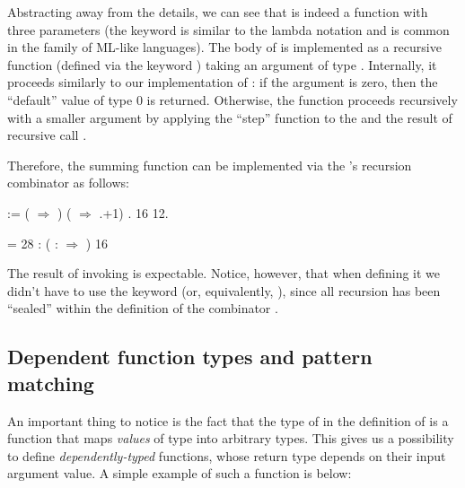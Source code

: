 \coqdocemptyline


Abstracting away from the details, we can see that  is
indeed a function with three parameters (the keyword  is similar
to the lambda notation and is common in the family of ML-like
languages).  The body of  is implemented as a recursive
function (defined via the keyword ) taking an argument  of
type . Internally, it proceeds similarly to our implementation of
: if the argument  is zero, then the ``default'' value 
of type  0 is returned. Otherwise, the function proceeds
recursively with a smaller argument  by applying the ``step''
function  to the  and the result of recursive call  .


Therefore, the summing function can be implemented via the 's
recursion combinator as follows:
\begin{coqdoccode}
\coqdocemptyline
\coqdocnoindent
{}    :=  ( \coqdocvar{\_} \ensuremath{\Rightarrow} )  (   \ensuremath{\Rightarrow} .+1) .\coqdoceol
\coqdocemptyline
\coqdocnoindent
{}    16 12.\coqdoceol
\coqdocemptyline
\end{coqdoccode}


    = 28 : ( \coqdocvar{\_} :  \ensuremath{\Rightarrow} ) 16


The result of invoking  is expectable. Notice, however, that
when defining it we didn't have to use the keyword  (or,
equivalently, ), since all recursion has been ``sealed'' within the
definition of the combinator .


\subsection{Dependent function types and pattern matching}




An important thing to notice is the fact that the type of  in the
definition of  is a function that maps \textit{values} of type 
into arbitrary types. This gives us a possibility to define
\textit{dependently-typed} functions, whose return type depends on their
input argument value. A simple example of such a function is below:


